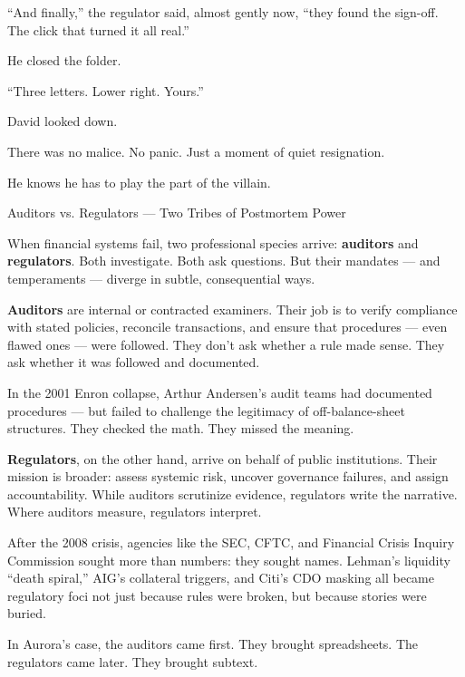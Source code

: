 “And finally,” the regulator said, almost gently now, “they found the sign-off. The click 
that turned it all real.”

He closed the folder.

“Three letters. Lower right. Yours.”

David looked down.

There was no malice. No panic. Just a moment of quiet resignation.

He knows he has to play the part of the villain. 

\medskip

\begin{HistoricalSidebar}{Auditors vs. Regulators — Two Tribes of Postmortem Power}

  When financial systems fail, two professional species arrive: \textbf{auditors} and \textbf{regulators}. 
  Both investigate. Both ask questions. But their mandates — and temperaments — diverge in subtle, consequential ways.

  \medskip
  
  \textbf{Auditors} are internal or contracted examiners. Their job is to verify compliance with stated policies, 
  reconcile transactions, and ensure that procedures — even flawed ones — were followed. They don’t ask whether a 
  rule made sense. They ask whether it was followed and documented.

  \medskip
  
  In the 2001 Enron collapse, Arthur Andersen’s audit teams had documented procedures — but failed to challenge 
  the legitimacy of off-balance-sheet structures. They checked the math. They missed the meaning.

  \medskip
  
  \textbf{Regulators}, on the other hand, arrive on behalf of public institutions. Their mission is broader: 
  assess systemic risk, uncover governance failures, and assign accountability. While auditors scrutinize evidence, 
  regulators write the narrative. Where auditors measure, regulators interpret.

  \medskip
  
  After the 2008 crisis, agencies like the SEC, CFTC, and Financial Crisis Inquiry Commission sought more than numbers: 
  they sought names. Lehman’s liquidity “death spiral,” AIG’s collateral triggers, and Citi’s CDO masking all became 
  regulatory foci not just because rules were broken, but because stories were buried.

  \medskip
  
  In Aurora’s case, the auditors came first. They brought spreadsheets.  
  The regulators came later. They brought subtext.
  
\end{HistoricalSidebar}


